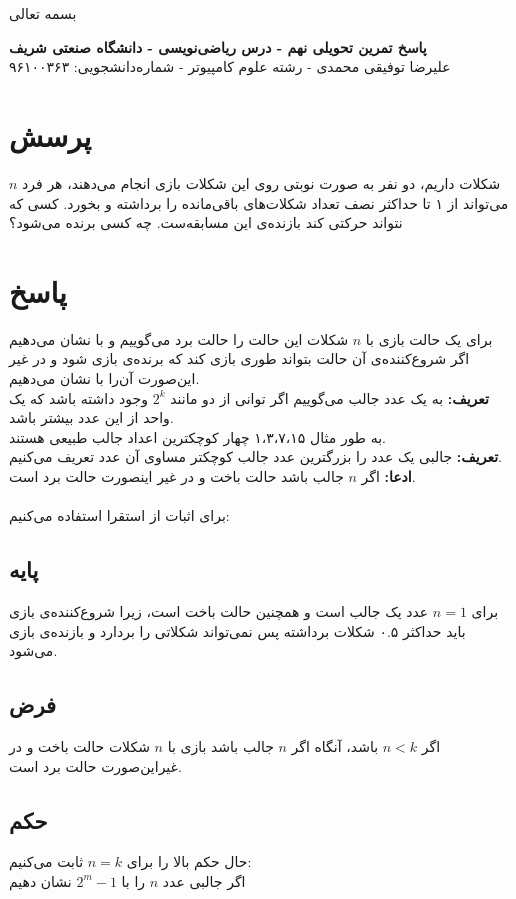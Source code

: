 \documentclass[12pt,a4paper]{article}
\begin{document}
\begin{center}
	بسمه تعالی
\end{center}
\begin{center}
	\textbf{پاسخ تمرین تحویلی نهم - درس ریاضی‌نویسی - دانشگاه صنعتی شریف}
	\\
	علیرضا توفیقی محمدی - رشته علوم کامپیوتر - شماره‌دانشجویی: ۹۶۱۰۰۳۶۳
\end{center}
\section*{پرسش}
$n$ 
شکلات داریم، دو نفر به صورت نوبتی روی این شکلات بازی انجام می‌دهند، هر فرد می‌تواند از ۱ تا حداکثر نصف تعداد شکلات‌های باقی‌مانده را برداشته و بخورد. کسی که نتواند حرکتی کند بازنده‌ی این مسابقه‌ست. چه کسی برنده می‌شود؟
\section*{پاسخ}
برای یک حالت بازی با $n$ شکلات این حالت را حالت برد می‌گوییم و با  نشان می‌دهیم اگر شروع‌کننده‌ی آن حالت بتواند طوری بازی کند که برنده‌ی بازی شود و در غیر این‌صورت آن‌را با
نشان می‌دهیم.
\\
\textbf{تعریف:}
به یک عدد جالب می‌گوییم اگر توانی از دو مانند $2^k$ وجود داشته باشد که یک واحد از این عدد بیشتر باشد.
\\
به طور مثال ۱،۳،۷،۱۵ چهار کوچکترین اعداد جالب طبیعی هستند.
\\
\textbf{تعریف:}
جالبی یک عدد را بزرگترین عدد جالب کوچکتر مساوی آن عدد تعریف می‌کنیم.
\\
\textbf{ادعا:}
اگر $n$ جالب باشد حالت باخت و در غیر اینصورت حالت برد است.
\\
\\
برای اثبات از استقرا استفاده می‌کنیم:
\subsection*{پایه}
برای $n=1$ عدد یک جالب است و همچنین حالت باخت است، زیرا شروع‌کننده‌ی بازی باید حداکثر ۰.۵ شکلات برداشته پس نمی‌تواند شکلاتی را بردارد و بازنده‌ی بازی می‌شود.
\subsection*{فرض}
اگر $n<k$ باشد، آنگاه اگر $n$ جالب باشد بازی با $n$ شکلات حالت باخت و در غیراین‌صورت حالت برد است.
\subsection*{حکم}
حال حکم بالا را برای $n=k$ ثابت می‌کنیم:
\\
اگر جالبی عدد $n$ را با 
$2^m - 1$
نشان دهیم
\end{document}
